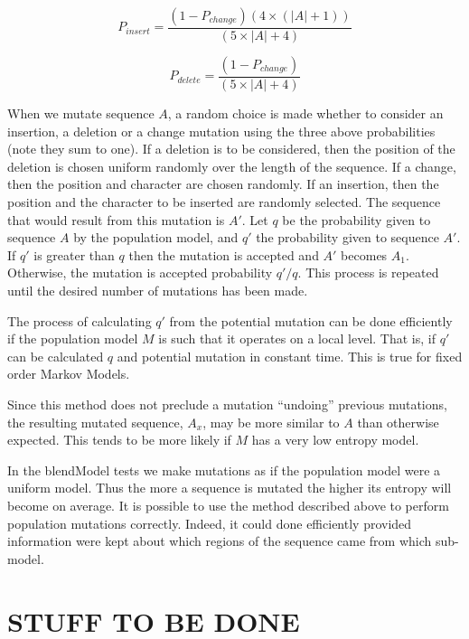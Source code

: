 \documentclass[letterpaper,11pt,oneside]{article}
\begin{document}
$$P_{insert} = \frac{(1-P_{change})(4\times(|A|+1))}{(5\times|A|+4)}$$

$$P_{delete} = \frac{(1-P_{change})}{(5\times|A|+4)}$$

When we mutate sequence $A$, a random choice is made whether to consider an
insertion, a deletion or a change mutation using the three above probabilities
(note they sum to one).  If a deletion is to be considered, then the position
of the deletion is chosen uniform randomly over the length of the sequence.
If a change, then the position and character are chosen randomly.  If an
insertion, then the position and the character to be inserted are randomly
selected.  The sequence that would result from this mutation is $A'$.  Let
$q$ be the probability given to sequence $A$ by the population model, and $q'$
the probability given to sequence $A'$.  If $q'$ is greater than $q$ then the
mutation is accepted and $A'$ becomes $A_1$.  Otherwise, the mutation is
accepted probability $q'/q$.  This process is repeated until the desired
number of mutations has been made.

The process of calculating $q'$ from the potential mutation can be done
efficiently if the population model $M$ is such that it operates on a local
level.  That is, if $q'$ can be calculated $q$ and potential mutation in
constant time.  This is true for fixed order Markov Models.

Since this method does not preclude a mutation ``undoing'' previous mutations,
the resulting mutated sequence, $A_x$, may be more similar to $A$ than
otherwise expected.  This tends to be more likely if $M$ has a very low
entropy model.

In the blendModel tests we make mutations as if the population model were a
uniform model.  Thus the more a sequence is mutated the higher its entropy
will become on average.  It is possible to use the method described above to
perform population mutations correctly.  Indeed, it could done efficiently
provided information were kept about which regions of the sequence came from
which sub-model.


\section{STUFF TO BE DONE} 
\end{document}
